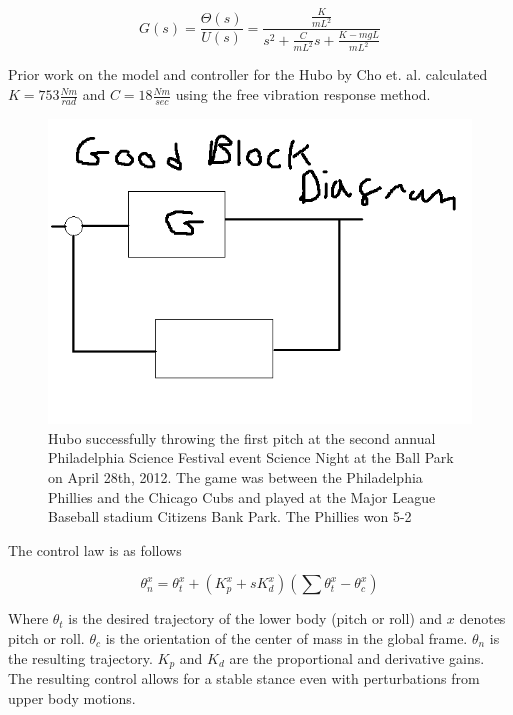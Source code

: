 \begin{equation}
G(s) = \frac{\Theta(s)}{U(s)} = \frac{\frac{K}{mL^2}}{s^2+\frac{C}{mL^2}s + \frac{K-mgL}{mL^2}}
\end{equation}

Prior work on the model and controller for the Hubo by Cho et. al. calculated $K=753\frac{Nm}{rad}$ and $C=18\frac{Nm}{sec}$ using the free vibration response method\cite{5379574}.


\begin{figure}[ht]
  \centering
\includegraphics[width=1.0\columnwidth]{./pix/blockDiagram.png}
  \caption{Hubo successfully throwing the first pitch at the second annual Philadelphia Science Festival event Science Night at the Ball Park on April 28th, 2012.  The game was between the Philadelphia Phillies and the Chicago Cubs and played at the Major League Baseball stadium Citizens Bank Park.  The Phillies won 5-2}
  \label{fig:ctrlBlockDiagram}
\end{figure}

The control law is as follows

\begin{equation}
\theta_{n}^x = \theta_{t}^x + \left(K_p^x+sK_d^x\right)\left(\sum \theta_{t}^x - \theta_{c}^x\right)
\end{equation}

Where $\theta_t$ is the desired trajectory of the lower body (pitch or roll) and $x$ denotes pitch or roll.  $\theta_{c}$ is the orientation of the center of mass in the global frame.  $\theta_n$ is the resulting trajectory.  $K_p$ and $K_d$ are the proportional and derivative gains.  The resulting control allows for a stable stance even with perturbations from upper body motions.
